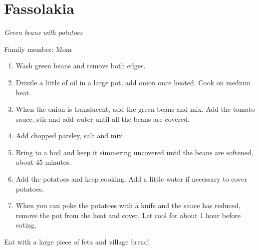 \chapter{Fassolakia}
\label{ch:fassolakia}


\textit{Green beans with potatoes}

Family member: Mom


\begin{enumerate}
    \item Wash green beans and remove both edges.
    \item Drizzle a little of oil in a large pot, add onion once heated. Cook on medium heat.
    \item When the onion is translucent, add the green beans and mix. Add the tomato sauce, stir and add water until all the beans are covered.
    \item Add chopped parsley, salt and mix.
    \item Bring to a boil and keep it simmering uncovered until the beans are softened, about 45 minutes.
    \item Add the potatoes and keep cooking. Add a little water if necessary to cover potatoes.
    \item When you can poke the potatoes with a knife and the sauce has reduced, remove the pot from the heat and cover. Let cool for about 1 hour before eating.
\end{enumerate}

Eat with a large piece of feta and village bread!
